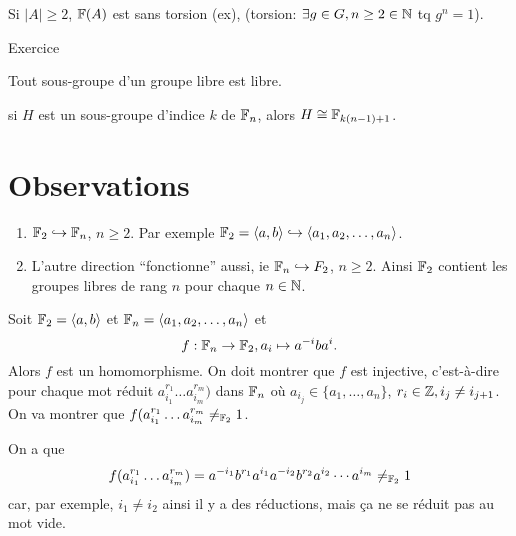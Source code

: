   \begin{prop}
    Si $|A| \geq 2$, $\mathbb{F}(A)$ est sans torsion (ex), (torsion: $\exists g \in G, n \geq 2 \in \mathbb{N}$ tq $g^n =
  1$).
  \end{prop}

  \begin{preuve}
    Exercice
  \end{preuve}

  \begin{theo}
    Tout sous-groupe d'un groupe libre est libre.
  \end{theo}

  \begin{theo}
    si $H$ est un sous-groupe d'indice $k$ de $\mathbb{F}_n$, alors $H \cong \mathbb{F}_{k(n-1)+1}$.
  \end{theo}

  \section{Observations}
  \label{sec:prop-grp-libre-obs}
  
  \begin{enumerate}
  \item $\mathbb{F}_2 \hookrightarrow \mathbb{F}_n$, $n \geq 2$. Par exemple $\mathbb{F}_2 = \langle a, b\rangle \hookrightarrow
    \langle a_1, a_2, \ldots, a_n \rangle$.
  \item L'autre direction ``fonctionne'' aussi, ie $\mathbb{F}_n \hookrightarrow F_2$, $n \geq 2$. Ainsi $\mathbb{F}_2$
    contient les groupes libres de rang $n$ pour chaque $n \in \mathbb{N}$.
  \end{enumerate}

  \begin{ex}
    Soit $\mathbb{F}_2 = \langle a,b \rangle$ et $\mathbb{F}_n = \langle a_1, a_2, \ldots, a_n \rangle$ et 
      \[f: \mathbb{F}_n \to \mathbb{F}_2, a_i \mapsto a^{-i}ba^i.\]
    Alors $f$ est un homomorphisme. On doit montrer que $f$ est injective, c'est-à-dire pour chaque mot réduit
    $a_{i_1}^{r_1} \ldots a_{i_m}^{r_m})$ dans $\mathbb{F}_n$ où $a_{i_j} \in \{a_1, \ldots, a_n \}$, $r_i \in \mathbb{Z}, i_j
    \neq i_{j+1}$. On
    va montrer que $f(a_{i_1}^{r_1} \ldots a_{i_m}^{r_m} \neq_{\mathbb{F}_2} 1$.

    On a que
      \[f(a_{i_1}^{r_1} \ldots a_{i_m}^{r_m}) = a^{-i_1}b^{r_1}a^{i_1}a^{-i_2}b^{r_2}a^{i_2} \cdots a^{i_m}
        \neq_{\mathbb{F}_2} 1\]
    car, par exemple, $i_1 \neq i_2$ ainsi il y a des réductions, mais ça ne se réduit pas au mot vide.
  \end{ex}

